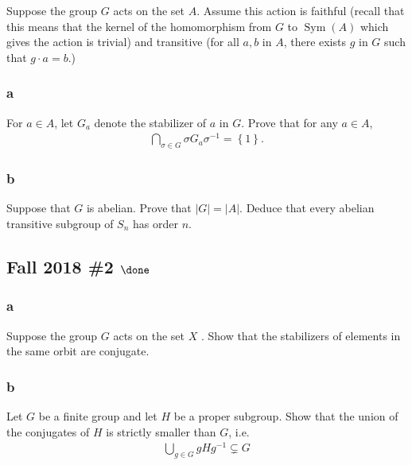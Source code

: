 Suppose the group \(G\) acts on the set \(A\). Assume this action is
faithful (recall that this means that the kernel of the homomorphism
from \(G\) to \(\operatorname{Sym}(A)\) which gives the action is
trivial) and transitive (for all \(a, b\) in \(A\), there exists \(g\)
in \(G\) such that \(g \cdot a = b\).)

\hypertarget{a-16}{%
\subsubsection{a}\label{a-16}}

For \(a \in A\), let \(G_a\) denote the stabilizer of \(a\) in \(G\).
Prove that for any \(a \in A\),
\begin{align*}
\bigcap_{\sigma\in G} \sigma G_a \sigma^{-1}= \left\{{1}\right\}
.\end{align*}

\hypertarget{b-16}{%
\subsubsection{b}\label{b-16}}

Suppose that \(G\) is abelian. Prove that \(|G| = |A|\). Deduce that
every abelian transitive subgroup of \(S_n\) has order \(n\).

\hypertarget{fall-2018-2-done}{%
\subsection{\texorpdfstring{Fall 2018 \#2
\(\done\)}{Fall 2018 \#2 \textbackslash done}}\label{fall-2018-2-done}}

\hypertarget{a-17}{%
\subsubsection{a}\label{a-17}}

Suppose the group \(G\) acts on the set \(X\) . Show that the
stabilizers of elements in the same orbit are conjugate.

\hypertarget{b-17}{%
\subsubsection{b}\label{b-17}}

Let \(G\) be a finite group and let \(H\) be a proper subgroup. Show
that the union of the conjugates of \(H\) is strictly smaller than
\(G\), i.e.
\begin{align*}
\bigcup_{g\in G} gHg^{-1}\subsetneq G
\end{align*}


